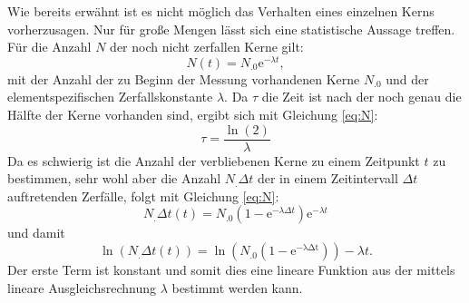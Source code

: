 Wie bereits erwähnt ist es nicht möglich das Verhalten eines einzelnen Kerns vorherzusagen. Nur für große Mengen lässt sich eine statistische Aussage treffen.
Für die Anzahl $N$ der noch nicht zerfallen Kerne gilt:
\begin{equation}
N(t)=N_.0\mathrm{e}^{-\lambda t},\label{eq:N}
\end{equation}
mit der Anzahl der zu Beginn der Messung vorhandenen Kerne $N_.0$ und der elementspezifischen Zerfallskonstante $\lambda$.
Da $\tau$ die Zeit ist nach der noch genau die Hälfte der Kerne vorhanden sind, ergibt sich mit Gleichung \eqref{eq:N}:
\begin{equation}
\tau=\frac{\ln{(2)}}{\lambda}\label{eq:T}
\end{equation}
Da es schwierig ist die Anzahl der verbliebenen Kerne zu einem Zeitpunkt $t$ zu bestimmen, sehr wohl aber die Anzahl $N_.{\Delta t}$ der in einem Zeitintervall $\Delta t$ auftretenden Zerfälle, folgt mit Gleichung \eqref{eq:N}:
\begin{equation*}
N_.{\Delta t}(t)=N_.0\left(1-\mathrm{e}^{-\lambda\Delta t}\right)\mathrm{e}^{-\lambda t}
\end{equation*}
und damit 
\begin{equation}
\ln{\left(N_.{\Delta t}(t)\right)} = \ln{\left(N_.0\left(1-\mathrm{e^{-\lambda\Delta t}}\right)\right)}-\lambda t\text{.}\label{eq:ln}
\end{equation}
Der erste Term ist konstant und somit dies eine lineare Funktion aus der mittels lineare Ausgleichsrechnung $\lambda$ bestimmt werden kann.
